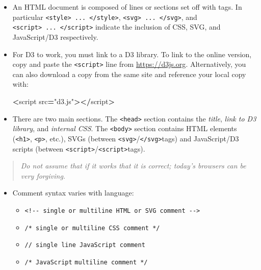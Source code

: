 \documentclass[
  openany]{book}
\newenvironment{Shaded}{\begin{snugshade}}{\end{snugshade}}
\newcommand{\NormalTok}[1]{#1}
\newcommand{\OperatorTok}[1]{\textcolor[rgb]{0.81,0.36,0.00}{\textbf{#1}}}
\newcommand{\StringTok}[1]{\textcolor[rgb]{0.31,0.60,0.02}{#1}}
\begin{document}
\begin{itemize}
\item
  An HTML document is composed of lines or sections set off with tags. In particular \texttt{\textless{}style\textgreater{}\ ...\ \textless{}/style\textgreater{}}, \texttt{\textless{}svg\textgreater{}\ ...\ \textless{}/svg\textgreater{}}, and \texttt{\textless{}script\textgreater{}\ ...\ \textless{}/script\textgreater{}} indicate the inclusion of CSS, SVG, and JavaScript/D3 respectively.
\item
  For D3 to work, you must link to a D3 library. To link to the online version, copy and paste the \texttt{\textless{}script\textgreater{}} line from \url{https://d3js.org}. Alternatively, you can also download a copy from the same site and reference your local copy with:

\begin{Shaded}
\begin{Highlighting}[]
\OperatorTok{\textless{}}\NormalTok{script src}\OperatorTok{=}\StringTok{"d3.js"}\OperatorTok{\textgreater{}\textless{}/}\NormalTok{script}\OperatorTok{\textgreater{}}
\end{Highlighting}
\end{Shaded}
\item
  There are two main sections. The \texttt{\textless{}head\textgreater{}} section contains the \emph{title}, \emph{link to D3 library}, and \emph{internal CSS}. The \texttt{\textless{}body\textgreater{}} section contains HTML elements (\texttt{\textless{}h1\textgreater{}}, \texttt{\textless{}p\textgreater{}}, etc.), SVGs (between \texttt{\textless{}svg\textgreater{}}/\texttt{\textless{}/svg\textgreater{}}tags) and JavaScript/D3 scripts (between \texttt{\textless{}script\textgreater{}}/\texttt{\textless{}script\textgreater{}}tags).
\end{itemize}

\begin{quote}
\emph{Do not assume that if it works that it is correct; today's browsers can be very forgiving.}
\end{quote}

\begin{itemize}
\item
  Comment syntax varies with language:

  \begin{itemize}
  \item
    \texttt{\textless{}!-\/-\ single\ or\ multiline\ HTML\ or\ SVG\ comment\ -\/-\textgreater{}}
  \item
    \texttt{/*\ single\ or\ multiline\ CSS\ comment\ */}
  \item
    \texttt{//\ single\ line\ JavaScript\ comment}
  \item
    \texttt{/*\ JavaScript} \texttt{multiline\ comment\ */}
  \end{itemize}
\end{itemize}
\end{document}
